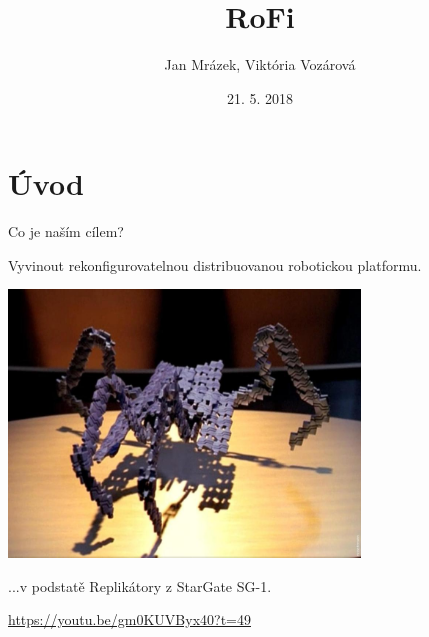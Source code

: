 \documentclass{beamer}
\title[RoFi]{RoFi}
\author{Jan Mrázek, Viktória Vozárová}
\institute{Paradise}
\date{21. 5. 2018}
\begin{document}
\begin{frame}
  \titlepage
\end{frame}

\section{Úvod}

\begin{frame}{Co je naším cílem?}

    Vyvinout rekonfigurovatelnou distribuovanou robotickou platformu.

    \begin{center}
    \includegraphics[width=0.7\textwidth]{img/replicator2}

    ...v podstatě Replikátory z StarGate SG-1.

    \url{https://youtu.be/gm0KUVByx40?t=49}
    \end{center}

\end{frame}
\end{document}
